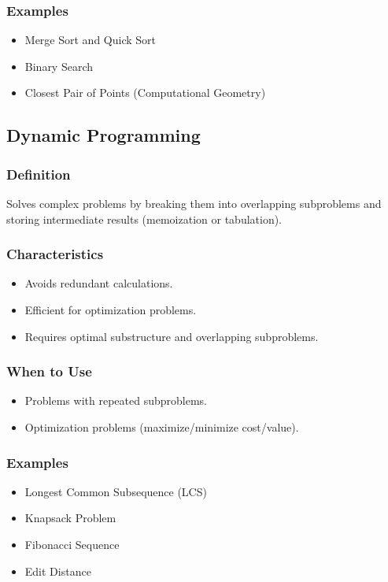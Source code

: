 \documentclass[12pt]{article}
\begin{document}
\subsubsection{Examples}
\begin{itemize}
    \item Merge Sort and Quick Sort
    \item Binary Search
    \item Closest Pair of Points (Computational Geometry)
\end{itemize}

\subsection{Dynamic Programming}

\subsubsection{Definition}
Solves complex problems by breaking them into overlapping subproblems and storing intermediate results (memoization or tabulation).

\subsubsection{Characteristics}
\begin{itemize}
    \item Avoids redundant calculations.
    \item Efficient for optimization problems.
    \item Requires optimal substructure and overlapping subproblems.
\end{itemize}

\subsubsection{When to Use}
\begin{itemize}
    \item Problems with repeated subproblems.
    \item Optimization problems (maximize/minimize cost/value).
\end{itemize}

\subsubsection{Examples}
\begin{itemize}
    \item Longest Common Subsequence (LCS)
    \item Knapsack Problem
    \item Fibonacci Sequence
    \item Edit Distance
\end{itemize}
\end{document}
